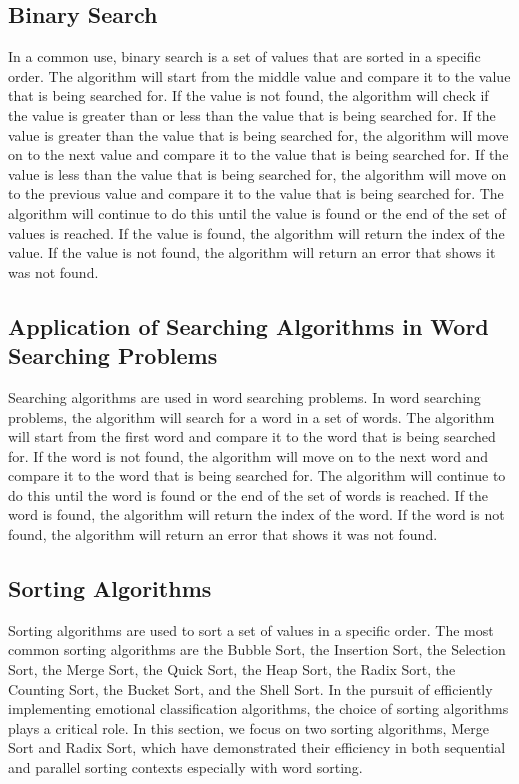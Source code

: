\documentclass[11pt]{article}
\begin{document}
\begin{multicols*}{2}
    \subsection*{Binary Search}
    \par In a common use, binary search is a set of values that are sorted in a specific order. The algorithm will start from the middle value and compare it to the value that is being searched for. If the value is not found, the algorithm will check if the value is greater than or less than the value that is being searched for. If the value is greater than the value that is being searched for, the algorithm will move on to the next value and compare it to the value that is being searched for. If the value is less than the value that is being searched for, the algorithm will move on to the previous value and compare it to the value that is being searched for. The algorithm will continue to do this until the value is found or the end of the set of values is reached. If the value is found, the algorithm will return the index of the value. If the value is not found, the algorithm will return an error that shows it was not found.\cite{binary_searches}
    \subsection*{Application of Searching Algorithms in Word Searching Problems}
    \par Searching algorithms are used in word searching problems. In word searching problems, the algorithm will search for a word in a set of words. The algorithm will start from the first word and compare it to the word that is being searched for. If the word is not found, the algorithm will move on to the next word and compare it to the word that is being searched for. The algorithm will continue to do this until the word is found or the end of the set of words is reached. If the word is found, the algorithm will return the index of the word. If the word is not found, the algorithm will return an error that shows it was not found.\cite*{tf_idf_classification}    
    \subsection*{Sorting Algorithms}
    \par Sorting algorithms are used to sort a set of values in a specific order. The most common sorting algorithms are the Bubble Sort, the Insertion Sort, the Selection Sort, the Merge Sort, the Quick Sort, the Heap Sort, the Radix Sort, the Counting Sort, the Bucket Sort, and the Shell Sort. \cite*{sorting_algorithm_comparison} In the pursuit of efficiently implementing emotional classification algorithms, the choice of sorting algorithms plays a critical role. In this section, we focus on two sorting algorithms, Merge Sort and Radix Sort, which have demonstrated their efficiency in both sequential and parallel sorting contexts especially with word sorting. \cite*{sorting_algorithm_comparison}

\end{multicols*}
\end{document}
